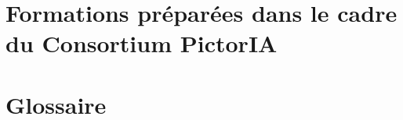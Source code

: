 

\chapter[Formations Arkindex et Callico]{Formations préparées dans le cadre du Consortium PictorIA}
\label{sec:Formations}





\backmatter %


\newpage{\pagestyle{empty}\cleardoublepage}

\cleardoublepage
{}
\listoffigures
{}


\cleardoublepage
{}
\listoftables
{}



\chapter*{Glossaire}
\label{sec:Glossaire}

\tableofcontents
